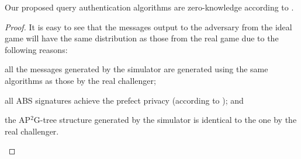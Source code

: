 \begin{lemma}\label{lemma:access-control:query-zero-knowledge}
  Our proposed query authentication algorithms are zero-knowledge according to .
\end{lemma}

\begin{proof}
  It is easy to see that the messages output to the adversary from the ideal game will have the same distribution as those from the real game due to the following reasons:
  \begin{inlineenum}
  \item all the messages generated by the simulator are generated using the same algorithms as those by the real challenger;
  \item all ABS signatures achieve the prefect privacy (according to ); and
  \item the AP$^2$G-tree structure generated by the simulator is identical to the one by the real challenger.
  \end{inlineenum}
\end{proof}
